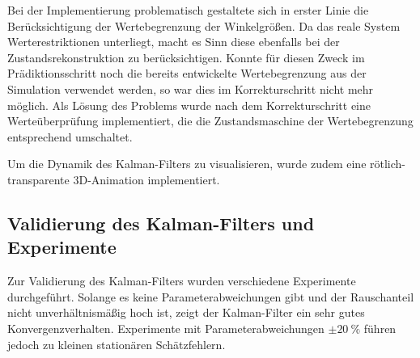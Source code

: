 \documentclass[10pt,twocolumn]{article}
\begin{document}
	Bei der Implementierung problematisch gestaltete sich in erster Linie die Berücksichtigung der Wertebegrenzung der Winkelgrößen.
	Da das reale System Werterestriktionen unterliegt, macht es Sinn diese ebenfalls bei der Zustandsrekonstruktion zu berücksichtigen.
	Konnte für diesen Zweck im Prädiktionsschritt noch die bereits entwickelte Wertebegrenzung aus der Simulation verwendet werden, so war dies im Korrekturschritt nicht mehr möglich.
	Als Lösung des Problems wurde nach dem Korrekturschritt eine Werteüberprüfung implementiert, die die Zustandsmaschine der Wertebegrenzung entsprechend umschaltet.
	
	Um die Dynamik des Kalman-Filters zu visualisieren, wurde zudem eine rötlich-transparente 3D-Animation implementiert.
	
	\subsection{Validierung des Kalman-Filters und Experimente}
	Zur Validierung des Kalman-Filters wurden verschiedene Experimente durchgeführt.
	Solange es keine Parameterabweichungen gibt und der Rauschanteil nicht unverhältnismäßig hoch ist, zeigt der Kalman-Filter ein sehr gutes Konvergenzverhalten.
	Experimente mit Parameterabweichungen $\pm \SI{20}{\percent}$ führen jedoch zu kleinen stationären Schätzfehlern.
	
	

	
	
	\nocite{ex3}
\end{document}
